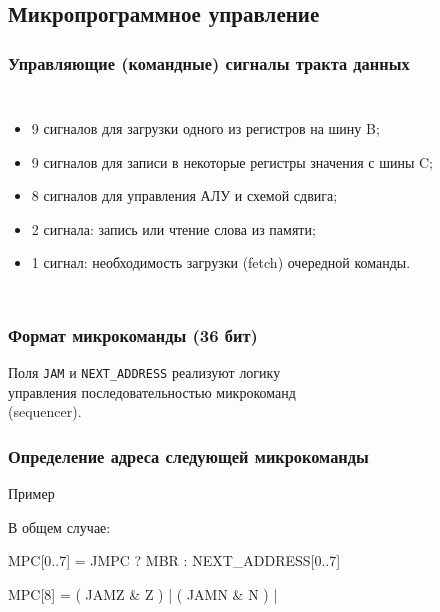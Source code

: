 \subsection{Микропрограммное управление}

\begin{frame}
\frametitle{Управляющие (командные) сигналы тракта данных}
\begin{columns}
        \column{4cm}

        \column{9cm}

\pause\begin{itemize}\small
    \item 9 сигналов для загрузки одного из регистров на шину B;
    \item 9 сигналов для записи в некоторые регистры значения с шины C;
    \item 8 сигналов для управления АЛУ и схемой сдвига;
    \item 2 сигнала: запись или чтение слова из памяти;
    \item 1 сигнал: необходимость загрузки (fetch) очередной команды.
\end{itemize}
\pause\color{blue}{Сколько всего управляющих сигналов?}\\
\pause\color{blue}{Можно ли сэкономить?}\\
\pause \color{red}{А давайте применим декодер!}
\end{columns}

\end{frame}

\begin{frame}
\frametitle{Формат микрокоманды (36 бит)}
\pause

Поля \texttt{JAM} и \texttt{NEXT\_ADDRESS} реализуют логику \\
    \alert{управления последовательностью микрокоманд}\\
    (\alert{sequencer}).
\end{frame}

\begin{frame}
\frametitle{Определение адреса следующей микрокоманды}

    Пример

    \pause
    В общем случае:

    \pause
    {\small \ttfamily
    MPC[0..7] = JMPC ? MBR : NEXT\_ADDRESS[0..7]}

    \pause
    {\small \ttfamily MPC[8] = ( JAMZ \& Z ) | ( JAMN \& N )
        | \color{gray}{NEXT\_ADDRESS[8]}}
\end{frame}

